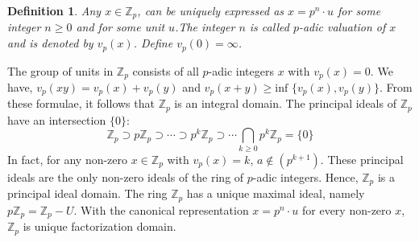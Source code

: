\documentclass[12pt,a4paper]{article}
\newtheorem{dfn}{Definition}[section]
\begin{document}
	\begin{dfn}\label{dfn padic valuation}
		Any $x \in \mathbb{Z}_p$, can be uniquely expressed as $x=p^n \cdot u$ for some integer $n \geq 0$ and for some unit $u$.The integer $n$ is called $p$-adic valuation of $x$ and is denoted by $v_p(x)$. Define $v_p(0) = \infty$.
	\end{dfn}
	The group of units in $\mathbb{Z}_p$ consists of all $p$-adic integers $x$ with $v_p(x) = 0$. We have, $v_p(xy) = v_p(x)+v_p(y)$ and $v_p(x+y) \geq \mbox{inf }\{v_p(x),v_p(y)\}$. From these formulae, it follows that $\mathbb{Z}_p$ is an integral domain. The principal ideals of $\mathbb{Z}_p$ have an intersection $\{0\}$:
	\begin{equation*}
		\mathbb{Z}_p \supset p\mathbb{Z}_p \supset \cdots \supset p^k\mathbb{Z}_p \supset \cdots \bigcap_{k \geq 0} p^k\mathbb{Z}_p=\{0\}
	\end{equation*}
	In fact, for any non-zero $x \in \mathbb{Z}_p$ with $v_p(x)=k$, $a \notin (p^{k+1})$. These principal ideals are the only non-zero ideals of the ring of $p$-adic integers. Hence, $\mathbb{Z}_p$ is a principal ideal domain. The ring $\mathbb{Z}_p$ has a unique maximal ideal, namely $p\mathbb{Z}_p = \mathbb{Z}_p - U$. With the canonical representation $x=p^n \cdot u$ for every non-zero $x$, $\mathbb{Z}_p$ is unique factorization domain.
\end{document}
